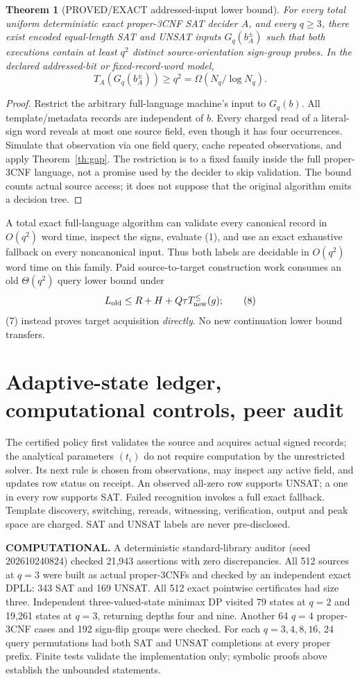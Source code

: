 \documentclass[11pt]{article}
\newtheorem{theorem}{Theorem}
\begin{document}
\begin{theorem}[PROVED/EXACT addressed-input lower bound]
For every total uniform deterministic exact proper-3CNF SAT decider $A$, and every $q\ge3$, there exist encoded equal-length SAT and UNSAT inputs $G_q(b_A^\pm)$ such that both executions contain at least $q^2$ distinct source-orientation sign-group probes. In the declared addressed-bit or fixed-record-word model,
\[
T_A(G_q(b_A^\pm))\ge q^2=\Omega(N_q/\log N_q).
\tag{7}
\]
\end{theorem}
\begin{proof}
Restrict the arbitrary full-language machine's input to $G_q(b)$. All template/metadata records are independent of $b$. Every charged read of a literal-sign word reveals at most one source field, even though it has four occurrences. Simulate that observation via one field query, cache repeated observations, and apply Theorem~\ref{th:gap}. The restriction is to a fixed family inside the full proper-3CNF language, not a promise used by the decider to skip validation. The bound counts actual source access; it does not suppose that the original algorithm emits a decision tree.
\end{proof}
A total exact full-language algorithm can validate every canonical record in $O(q^2)$ word time, inspect the signs, evaluate (1), and use an exact exhaustive fallback on every noncanonical input. Thus both labels are decidable in $O(q^2)$ word time on this family. Paid source-to-target construction work consumes an old $\Theta(q^2)$ query lower bound under
\[
L_{\rm old}\le R+H+Q\tau T_{\rm new}^{\le}(g);
\tag{8}
\]
(7) instead proves target acquisition \emph{directly}. No new continuation lower bound transfers.

\section{Adaptive-state ledger, computational controls, peer audit}
The certified policy first validates the source and acquires actual signed records; the analytical parameters $(t_i)$ do not require computation by the unrestricted solver. Its next rule is chosen from observations, may inspect any active field, and updates row status on receipt. An observed all-zero row supports UNSAT; a one in every row supports SAT. Failed recognition invokes a full exact fallback. Template discovery, switching, rereads, witnessing, verification, output and peak space are charged. SAT and UNSAT labels are never pre-disclosed.

\textbf{COMPUTATIONAL.} A deterministic standard-library auditor (seed 202610240824) checked 21,943 assertions with zero discrepancies. All 512 sources at $q=3$ were built as actual proper-3CNFs and checked by an independent exact DPLL: 343 SAT and 169 UNSAT. All 512 exact pointwise certificates had size three. Independent three-valued-state minimax DP visited 79 states at $q=2$ and 19,261 states at $q=3$, returning depths four and nine. Another 64 $q=4$ proper-3CNF cases and 192 sign-flip groups were checked. For each $q=3,4,8,16$, 24 query permutations had both SAT and UNSAT completions at every proper prefix. Finite tests validate the implementation only; symbolic proofs above establish the unbounded statements.
\end{document}

